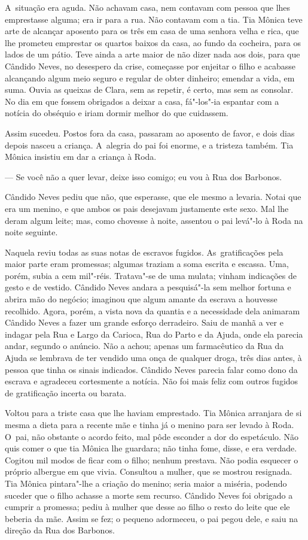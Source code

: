\begin{linenumbers}
A~situação era aguda. Não achavam casa, nem contavam com pessoa que lhes
emprestasse alguma; era ir para a rua. Não contavam com a tia. Tia
Mônica teve arte de alcançar aposento para os três em casa de uma
senhora velha e rica, que lhe prometeu emprestar os quartos baixos da
casa, ao fundo da cocheira, para os lados de um pátio. Teve ainda a arte
maior de não dizer nada aos dois, para que Cândido Neves, no desespero
da crise, começasse por enjeitar o filho e acabasse alcançando algum
meio seguro e regular de obter dinheiro; emendar a vida, em suma. Ouvia
as queixas de Clara, sem as repetir, é certo, mas sem as consolar. No
dia em que fossem obrigados a deixar a casa, fá"-los"-ia espantar com a
notícia do obséquio e iriam dormir melhor do que cuidassem.

Assim sucedeu. Postos fora da casa, passaram ao aposento de favor, e
dois dias depois nasceu a criança. A~alegria do pai foi enorme, e a
tristeza também. Tia Mônica insistiu em dar a criança à Roda.

--- Se você não a quer levar, deixe isso comigo; eu vou à Rua dos
Barbonos.

Cândido Neves pediu que não, que esperasse, que ele mesmo a levaria.
Notai que era um menino, e que ambos os pais desejavam justamente este
sexo. Mal lhe deram algum leite; mas, como chovesse à noite, assentou o
pai levá"-lo à Roda na noite seguinte.

Naquela reviu todas as suas notas de escravos fugidos. As~gratificações
pela maior parte eram promessas; algumas traziam a soma escrita e
escassa. Uma, porém, subia a cem mil"-réis. Tratava"-se de uma mulata;
vinham indicações de gesto e de vestido. Cândido Neves andara a
pesquisá"-la sem melhor fortuna e abrira mão do negócio; imaginou que
algum amante da escrava a houvesse recolhido. Agora, porém, a vista nova
da quantia e a necessidade dela animaram Cândido Neves a fazer um grande
esforço derradeiro. Saiu de manhã a ver e indagar pela Rua e Largo da
Carioca, Rua do Parto e da Ajuda, onde ela parecia andar, segundo o
anúncio. Não a achou; apenas um farmacêutico da Rua da Ajuda se lembrava
de ter vendido uma onça de qualquer droga, três dias antes, à pessoa que
tinha os sinais indicados. Cândido Neves parecia falar como dono da
escrava e agradeceu cortesmente a notícia. Não foi mais feliz com outros
fugidos de gratificação incerta ou barata.

Voltou para a triste casa que lhe haviam emprestado. Tia Mônica
arranjara de si mesma a dieta para a recente mãe e tinha já o menino
para ser levado à Roda. O~pai, não obstante o acordo feito, mal pôde
esconder a dor do espetáculo. Não quis comer o que tia Mônica lhe
guardara; não tinha fome, disse, e era verdade. Cogitou mil modos de
ficar com o filho; nenhum prestava. Não podia esquecer o próprio
albergue em que vivia. Consultou a mulher, que se mostrou resignada. Tia
Mônica pintara"-lhe a criação do menino; seria maior a miséria, podendo
suceder que o filho achasse a morte sem recurso. Cândido Neves foi
obrigado a cumprir a promessa; pediu à mulher que desse ao filho o resto
do leite que ele beberia da mãe. Assim se fez; o pequeno adormeceu, o
pai pegou dele, e saiu na direção da Rua dos Barbonos.


\end{linenumbers}
